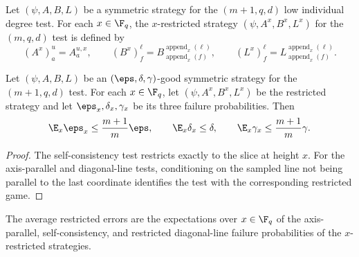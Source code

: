 \begin{definition}\label{def:restricted-strategy}
	\leanok
  Let $(\psi,A,B,L)$ be a symmetric strategy for the $(m+1,q,d)$ low individual degree test. For each $x \in \F_q$, the $x$-restricted strategy $(\psi,A^x,B^x,L^x)$ for the $(m,q,d)$ test is defined by
  \[
    (A^x)_a^u = A_a^{u,x},
    \qquad
    (B^x)_f^\ell = B_{\operatorname{append}_x(f)}^{\operatorname{append}_x(\ell)},
    \qquad
    (L^x)_f^\ell = L_{\operatorname{append}_x(f)}^{\operatorname{append}_x(\ell)}.
  \]
\end{definition}

\begin{lemma}\label{lem:restricted-probabilities}
	\leanok
  Let $(\psi,A,B,L)$ be an $(\eps,\delta,\gamma)$-good symmetric strategy for the $(m+1,q,d)$ test. For each $x \in \F_q$, let $(\psi,A^x,B^x,L^x)$ be the restricted strategy and let $\eps_x,\delta_x,\gamma_x$ be its three failure probabilities. Then
  \[
    \E_x \eps_x \le \frac{m+1}{m}\eps,
    \qquad
    \E_x \delta_x \le \delta,
    \qquad
    \E_x \gamma_x \le \frac{m+1}{m}\gamma.
  \]
\end{lemma}
\begin{proof}
	\leanok
	The self-consistency test restricts exactly to the slice at height $x$. For the axis-parallel and diagonal-line tests, conditioning on the sampled line not being parallel to the last coordinate identifies the test with the corresponding restricted game.
\end{proof}

\begin{definition}\label{def:average-restricted-errors}
	\leanok
	The average restricted errors are the expectations over $x \in \F_q$ of the
	axis-parallel, self-consistency, and restricted diagonal-line failure
	probabilities of the $x$-restricted strategies.
\end{definition}

